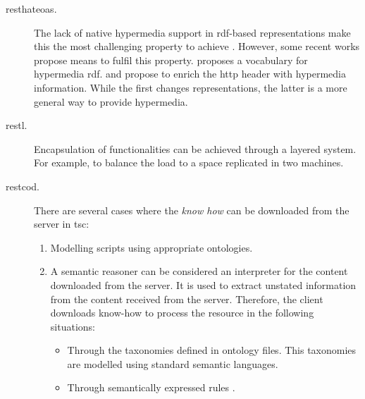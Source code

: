 \begin{description}
	\item[\ac{resthateoas}.] The lack of native hypermedia support in \ac{rdf}-based representations make this the most challenging property to achieve \citep{page_rest_2011}. %
				  However, some recent works propose means to fulfil this property.
				  \citet{kjernsmo_necessity_2012} proposes a vocabulary for hypermedia \ac{rdf}.
				  \citet{steiner_fulfilling_2011} and \citet{verborgh_functional_2012} propose to enrich the \ac{http} header with hypermedia information.
				  While the first changes representations, the latter is a more general way to provide hypermedia.
 \item[\ac{restl}.] Encapsulation of functionalities can be achieved through a layered system.
                     For example, to balance the load to a space replicated in two machines.
 \item[\ac{restcod}.] There are several cases where the \emph{know how} can be downloaded from the server in \ac{tsc}: %
            \begin{enumerate}
	      \item Modelling scripts using appropriate ontologies. %
	      \item A semantic reasoner can be considered an interpreter for the content downloaded from the server.
	            It is used to extract unstated information from the content received from the server.
	            Therefore, the client downloads know-how to process the resource in the following situations:
		    \begin{itemize}
		      \item Through the taxonomies defined in ontology files. %
		            This taxonomies are modelled using standard semantic languages. %
		      \item Through semantically expressed rules \citep{berners-lee_n3logic:_2008}. %
		    \end{itemize}
            \end{enumerate}
\end{description}


